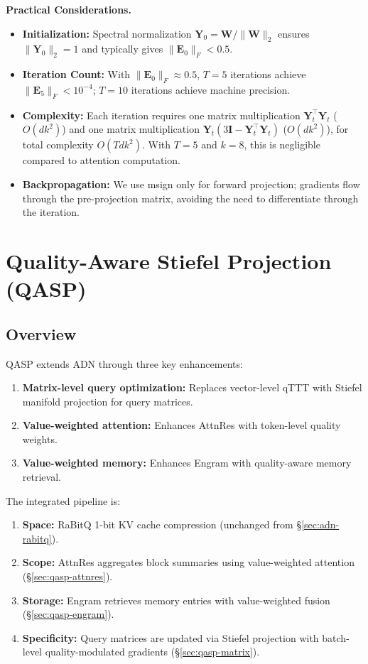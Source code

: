 \documentclass[twocolumn]{article}
\begin{document}
\textbf{Practical Considerations.}
\begin{itemize}[leftmargin=*]
    \item \textbf{Initialization:} Spectral normalization $\mathbf{Y}_0 = \mathbf{W} / \|\mathbf{W}\|_2$ ensures $\|\mathbf{Y}_0\|_2 = 1$ and typically gives $\|\mathbf{E}_0\|_F < 0.5$.
    \item \textbf{Iteration Count:} With $\|\mathbf{E}_0\|_F \approx 0.5$, $T = 5$ iterations achieve $\|\mathbf{E}_5\|_F < 10^{-4}$; $T = 10$ iterations achieve machine precision.
    \item \textbf{Complexity:} Each iteration requires one matrix multiplication $\mathbf{Y}_t^\top \mathbf{Y}_t$ ($O(dk^2)$) and one matrix multiplication $\mathbf{Y}_t (3\mathbf{I} - \mathbf{Y}_t^\top \mathbf{Y}_t)$ ($O(dk^2)$), for total complexity $O(Tdk^2)$. With $T=5$ and $k=8$, this is negligible compared to attention computation.
    \item \textbf{Backpropagation:} We use msign only for forward projection; gradients flow through the pre-projection matrix, avoiding the need to differentiate through the iteration.
\end{itemize}

\section{Quality-Aware Stiefel Projection (QASP)}
\label{sec:qasp}

\subsection{Overview}

QASP extends ADN through three key enhancements:
\begin{enumerate}[leftmargin=*]
    \item \textbf{Matrix-level query optimization:} Replaces vector-level qTTT with Stiefel manifold projection for query matrices.
    \item \textbf{Value-weighted attention:} Enhances AttnRes with token-level quality weights.
    \item \textbf{Value-weighted memory:} Enhances Engram with quality-aware memory retrieval.
\end{enumerate}

The integrated pipeline is:
\begin{enumerate}[leftmargin=*]
    \item \textbf{Space:} RaBitQ 1-bit KV cache compression (unchanged from \S\ref{sec:adn-rabitq}).
    \item \textbf{Scope:} AttnRes aggregates block summaries using value-weighted attention (\S\ref{sec:qasp-attnres}).
    \item \textbf{Storage:} Engram retrieves memory entries with value-weighted fusion (\S\ref{sec:qasp-engram}).
    \item \textbf{Specificity:} Query matrices are updated via Stiefel projection with batch-level quality-modulated gradients (\S\ref{sec:qasp-matrix}).
\end{enumerate}
\end{document}

